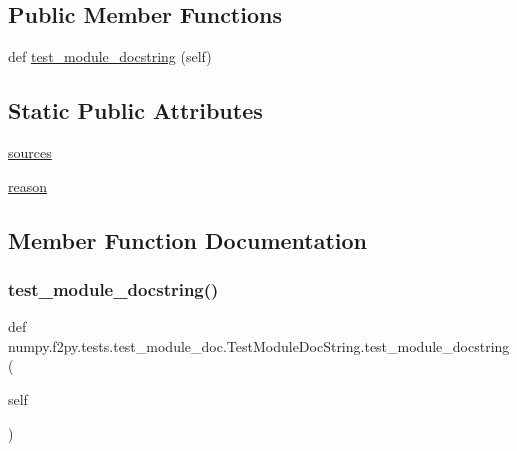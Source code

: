 \subsection*{Public Member Functions}
\begin{DoxyCompactItemize}
\item 
def \hyperlink{classnumpy_1_1f2py_1_1tests_1_1test__module__doc_1_1TestModuleDocString_a1fe6866f51aebfcffbb93a2bfb28b045}{test\+\_\+module\+\_\+docstring} (self)
\end{DoxyCompactItemize}
\subsection*{Static Public Attributes}
\begin{DoxyCompactItemize}
\item 
\hyperlink{classnumpy_1_1f2py_1_1tests_1_1test__module__doc_1_1TestModuleDocString_a5700ac747637b85b66526636772f96f7}{sources}
\item 
\hyperlink{classnumpy_1_1f2py_1_1tests_1_1test__module__doc_1_1TestModuleDocString_aef6dd34a5c938fe10487132daf403deb}{reason}
\end{DoxyCompactItemize}


\subsection{Member Function Documentation}
\mbox{\label{classnumpy_1_1f2py_1_1tests_1_1test__module__doc_1_1TestModuleDocString_a1fe6866f51aebfcffbb93a2bfb28b045}} 
\subsubsection{\texorpdfstring{test\+\_\+module\+\_\+docstring()}{test\_module\_docstring()}}
{\footnotesize\ttfamily def numpy.\+f2py.\+tests.\+test\+\_\+module\+\_\+doc.\+Test\+Module\+Doc\+String.\+test\+\_\+module\+\_\+docstring (\begin{DoxyParamCaption}\item[{}]{self }\end{DoxyParamCaption})}



